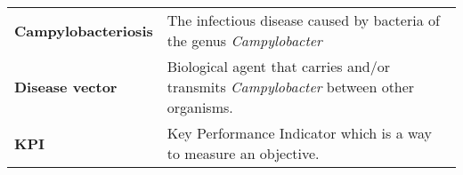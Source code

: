 \begin{table}[ht!]
\begin{tabular}{lm{45em}}
 \textbf{Campylobacteriosis} & The infectious disease caused by bacteria of the genus \emph{Campylobacter} \\
  \textbf{Disease vector} & Biological agent that carries and/or transmits \textit{Campylobacter} between other organisms. \\
  \textbf{KPI} & Key Performance Indicator which is a way to measure an objective.
\end{tabular}
\end{table}